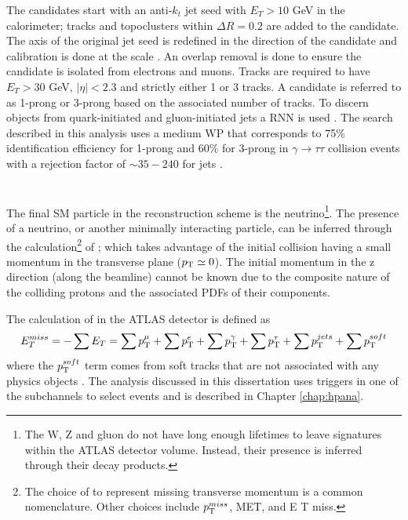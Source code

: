 		The \tauhad candidates start with an anti-$k_t$ jet seed with $E_T>10$ GeV in the calorimeter; tracks and topoclusters within $\Delta R = 0.2$ are added to the \tauhad candidate. The axis of the original jet seed is redefined in the direction of the \tauhad candidate and calibration is done at the \tauhad scale \cite{tau-id-calib}. An overlap removal is done to ensure the \tauhad candidate is isolated from electrons and muons. Tracks are required to have $E_{T}>30$ GeV, $|\eta|<2.3$ and strictly either 1 or 3 tracks. A \tauhad candidate is referred to as 1-prong or 3-prong based on the associated number of tracks. To discern \tauhad objects from quark-initiated and gluon-initiated jets a \gls{RNN} is used \cite{tau-id-rnn}. The search described in this analysis uses a medium \gls{WP} that corresponds to 75\% identification efficiency for 1-prong and 60\% for 3-prong in $\gamma \to \tau \tau$ collision events with a rejection factor of $\sim 35-240$ for jets \cite{tau-id-rnn}.
 
	\section{\Etm}\label{sec:reco-etmiss}
		The final \acrshort{SM} particle in the reconstruction scheme is the neutrino\footnote{The W, Z and gluon do not have long enough lifetimes to leave signatures within the \gls{ATLAS} detector volume. Instead, their presence is inferred through their decay products.}. The presence of a neutrino, or another minimally interacting particle, can be inferred through the calculation\footnote{The choice of \Etm to represent missing transverse momentum is a common nomenclature. Other choices include $p_{\text{T}}^{miss}$, MET, and E T miss.} of \Etm; which takes advantage of the initial collision having a small momentum in the transverse plane ($p_{\text{T}} \simeq 0$). The initial momentum in the z direction (along the beamline) cannot be known due to the composite nature of the colliding protons and the associated PDFs of their components.

		The calculation of \Etm in the \gls{ATLAS} detector is defined as
		\begin{equation}\label{eqn:etmiss}
		E_{T}^{miss} = - \sum E_{T} = \sum p_{\text{T}}^{\mu} + \sum p_{\text{T}}^{e} + \sum p_{\text{T}}^{\gamma} + \sum p_{\text{T}}^{\tau} + \sum p_{\text{T}}^{jets} + \sum p_{\text{T}}^{soft}
		\end{equation}
		where the $p_{\text{T}}^{soft}$ term comes from soft tracks that are not associated with any physics objects \cite{met-perf}. The analysis discussed in this dissertation uses \Etm triggers in one of the subchannels to select events and is described in Chapter \ref{chap:hpana}.